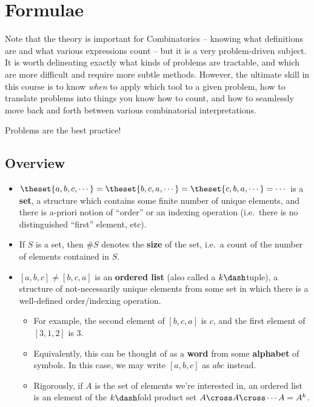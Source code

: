 \maketitle
\tableofcontents


\hypertarget{formulae}{%
\section{Formulae}\label{formulae}}

Note that the theory is important for Combinatorics -- knowing what
definitions are and what various expressions count -- but it is a very
problem-driven subject. It is worth delineating exactly what kinds of
problems are tractable, and which are more difficult and require more
subtle methods. However, the ultimate skill in this course is to know
\emph{when} to apply which tool to a given problem, how to translate
problems into things you know how to count, and how to seamlessly move
back and forth between various combinatorial interpretations.

Problems are the best practice!

\hypertarget{overview}{%
\subsection{Overview}\label{overview}}

\begin{itemize}
\item
  \(\theset{a, b, c, \cdots} = \theset{b, c, a, \cdots} = \theset{c, b, a, \cdots} = \cdots\)
  is a \textbf{set}, a structure which contains some finite number of
  unique elements, and there is a-priori notion of ``order'' or an
  indexing operation (i.e.~there is no distinguished ``first'' element,
  etc).
\item
  If \(S\) is a set, then \(\# S\) denotes the \textbf{size} of the set,
  i.e.~a count of the number of elements contained in \(S\).
\item
  \([a, b, c] \neq [b, c, a]\) is an \textbf{ordered list} (also called
  a \(k\dash\)tuple), a structure of not-necessarily unique elements
  from some set in which there is a well-defined order/indexing
  operation.

  \begin{itemize}
  \tightlist
  \item
    For example, the second element of \([b,c,a]\) is \(c\), and the
    first element of \([3,1,2]\) is 3.
  \item
    Equivalently, this can be thought of as a \textbf{word} from some
    \textbf{alphabet} of symbols. In this case, we may write \([a,b,c]\)
    as \(abc\) instead.
  \item
    Rigorously, if \(A\) is the set of elements we're interested in, an
    ordered list is an element of the \(k\dash\)fold product set
    \(A \cross A \cross \cdots A = A^k\).
  \end{itemize}
\end{itemize}

